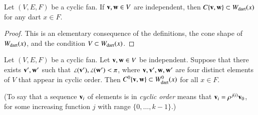 \begin{lemma}  Let $(V,E,F)$ be a cyclic fan.   If ${\mathbf v},{\mathbf w}\in V$ are independent, then $C\{{\mathbf v},{\mathbf w}\} \subset W_{\text{dart}}(x)$ for any dart $x\in F$.
\end{lemma}
%

\begin{proof}  This is an elementary consequence of the definitions, the cone shape of $W_{\text{dart}}(x)$,  and the condition $V\subset W_{\text{dart}}(x)$.
\end{proof}


\begin{lemma}  \label{lemma:internal}
Let $(V,E,F)$ be a cyclic fan. 
Let ${\mathbf v},{\mathbf w}\in V$ be independent.  Suppose that there exists ${\mathbf v}',{\mathbf w}'$ such
that $\angle({\mathbf v}'),\angle({\mathbf w}')<\pi$, where ${\mathbf v},{\mathbf v}',{\mathbf w},{\mathbf w}'$ are four distinct elements of
$V$ that appear in cyclic order.
Then $C^0\{{\mathbf v},{\mathbf w}\}\subset W^0_{\text{dart}}(x)$ for all $x\in F$.
\end{lemma}
%
%
%

(To say that a sequence ${\mathbf v}_i$ of elements is in {\it cyclic order} means that
${\mathbf v}_i = \rho^{j (i)}{\mathbf v}_0$, for some increasing function $j$ with range $\{0,\ldots,k-1\}$.)

